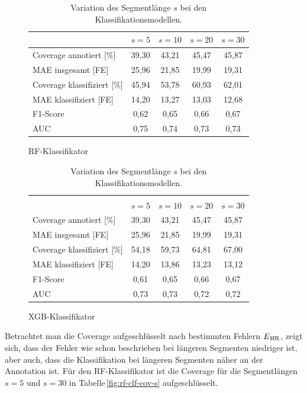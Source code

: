 \begin{table}[H]
	\begin{subfigure}{\textwidth}
	\centering
	\begin{tabular}{l || c | c | c | c }
								& $s = 5$	& $s=10$		& $s=20$		& $s=30$	\\ \hline
	Coverage annotiert [\%]		& 39,30		& 43,21	 	& 45,47		& 45,87\\
	\ac{MAE} insgesamt [FE]		& 25,96		& 21,85		& 19,99		& 19,31\\\hline
 	Coverage klassifiziert [\%]	& 45,94		& 53,78 		& 60,93		& 62,01\\
 	\ac{MAE} klassifiziert [FE]	& 14,20		& 13,27		& 13,03		& 12,68\\
 	F1-Score 					& 0,62		& 0,65		& 0,66		& 0,67\\
 	AUC 						& 0,75		& 0,74		& 0,73		& 0,73\\
 	\end{tabular}	
	\caption{\ac{RF}-Klassifikator}
	\end{subfigure}
	\begin{subfigure}{\textwidth}
	\centering
	\begin{tabular}{l || c | c | c | c }
	\multicolumn{5}{l}{	}	\\
								& $s = 5$	& $s=10$		& $s=20$		& $s=30$	\\ \hline
								
	Coverage annotiert [\%]		& 39,30		& 43,21	 	& 45,47		& 45,87\\
	\ac{MAE} insgesamt [FE]		& 25,96		& 21,85		& 19,99		& 19,31\\\hline
 	Coverage klassifiziert [\%]	& 54,18		& 59,73 		& 64,81		& 67,00\\
 	\ac{MAE} klassifiziert [FE]	& 14,20		& 13,86		& 13,23		& 13,12\\
 	F1-Score 					& 0,61		& 0,65		& 0,66		& 0,67\\
 	AUC 						& 0,73		& 0,73		& 0,72		& 0,72\\
 	\end{tabular}		
	\caption{\ac{XGB}-Klassifikator}
	\end{subfigure}
	\caption{Variation des Segmentlänge $s$ bei den Klassifikationsmodellen.}
	\label{fig:var-s-clf}
\end{table}

Betrachtet man die Coverage aufgeschlüsselt nach bestimmten Fehlern $E\textsubscript{HR}$, zeigt sich, dass der Fehler wie schon beschrieben bei längeren Segmenten niedriger ist, aber auch, dass die Klassifikation bei längeren Segmenten näher an der Annotation ist. Für den \ac{RF}-Klassifikator ist die Coverage für die Segmentlängen $s=5$ und $s=30$ in Tabelle\,\ref{fig:rf-clf-cov-s} aufgeschlüsselt.

